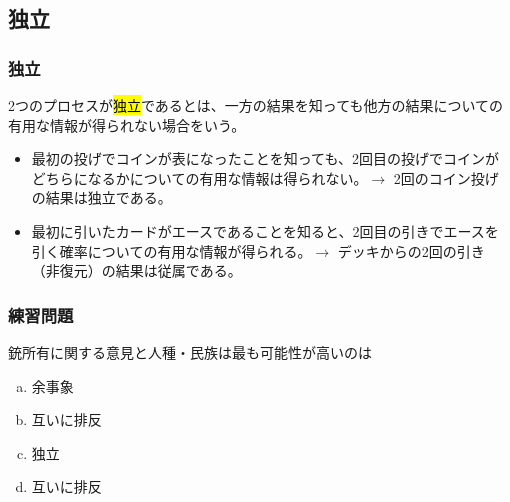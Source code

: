 
\subsection{独立}


\begin{frame}
\frametitle{独立}

2つのプロセスが\hl{独立}であるとは、一方の結果を知っても他方の結果についての有用な情報が得られない場合をいう。

\begin{itemize}

\item 最初の投げでコインが表になったことを知っても、2回目の投げでコインがどちらになるかについての有用な情報は得られない。$\rightarrow$ 2回のコイン投げの結果は独立である。

\item 最初に引いたカードがエースであることを知ると、2回目の引きでエースを引く確率についての有用な情報が得られる。$\rightarrow$ デッキからの2回の引き（非復元）の結果は従属である。

\end{itemize}

\end{frame}


\begin{frame}
\frametitle{練習問題}


銃所有に関する意見と人種・民族は最も可能性が高いのは
\begin{enumerate}[(a)]
\item 余事象
\item 互いに排反
\item 独立
\item 互いに排反
\end{enumerate}


\end{frame}

